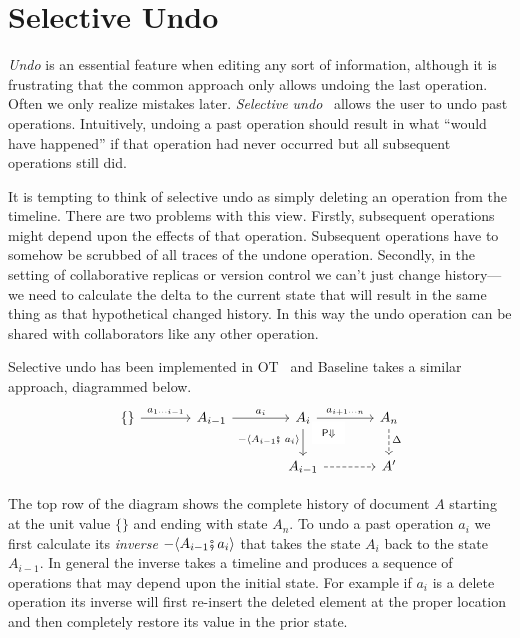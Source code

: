 \documentclass[english,submission]{programming}
\theoremstyle{definition}
\newcommand{\mathbox}[1]{\colorbox{black!10}{$#1$\phantom{i\hspace{-3.5pt}}}}
\begin{document}
\section{Selective Undo}\label{undo}

\textit{Undo} is an essential feature when editing any sort of information, although it is frustrating that the common approach only allows undoing the last operation. Often we only realize mistakes later. \textit{Selective undo}~\cite{berlage94} allows the user to undo past operations. Intuitively, undoing a past operation should result in what ``would have happened'' if that operation had never occurred but all subsequent operations still did.

It is tempting to think of selective undo as simply deleting an operation from the timeline. There are two problems with this view. Firstly, subsequent operations might depend upon the effects of that operation. Subsequent operations have to somehow be scrubbed of all traces of the undone operation. Secondly, in the setting of collaborative replicas or version control we can't just change history---we need to calculate the delta to the current state that will result in the same thing as that hypothetical changed history. In this way the undo operation can be shared with collaborators like any other operation.

Selective undo has been implemented in OT~\cite{sun00, weiss08} and Baseline takes a similar approach, diagrammed below.
\[\begin{tikzcd}[column sep=large]
	{\{\}} & {A_{i-1}} & {A_i} & {A_n} \\
	&& {A_{i-1}} & {A'}
	\arrow["{{{a_{1 \cdots i-1}}}}", from=1-1, to=1-2]
	\arrow["{{{a_i}}}", from=1-2, to=1-3]
	\arrow["{{{a_{i+1 \cdots n}}}}", from=1-3, to=1-4]
	\arrow["{{{- \langle A_{i-1}\fatsemi\  a_i \rangle}}}"'{pos=0.4}, from=1-3, to=2-3]
	\arrow["{{\begin{array}{c} \textsf{P}\Downarrow \end{array}}}"{description, pos=0.2}, draw=none, from=1-3, to=2-4]
	\arrow["{{{\Delta}}}"{pos=0.4}, dashed, from=1-4, to=2-4]
	\arrow[dashed, from=2-3, to=2-4]
\end{tikzcd}\]

The top row of the diagram shows the complete history of document \mathbox{A} starting at the unit value \mathbox{\{\}} and ending with state \mathbox{A_n}. To undo a past operation \mathbox{a_i} we first calculate its \textit{inverse} \mathbox{- \langle A_{i-1}\!\fatsemi a_i \rangle} that takes the state \mathbox{A_i} back to the state \mathbox{A_{i-1}}. In general the inverse takes a timeline and produces a sequence of operations that may depend upon the initial state. For example if \mathbox{a_i} is a \textsf{delete} operation its inverse will first re-insert the deleted element at the proper location and then completely restore its value in the prior state.
\end{document}
